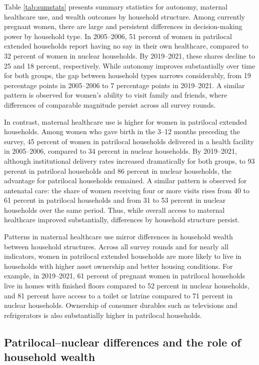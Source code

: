 \documentclass[12pt]{article}
\begin{document}
Table \ref{tab:sumstats} presents summary statistics for autonomy, maternal healthcare use, and wealth outcomes by household structure. Among currently pregnant women, there are large and persistent differences in decision-making power by household type. In 2005–2006, 51 percent of women in patrilocal extended households report having no say in their own healthcare, compared to 32 percent of women in nuclear households. By 2019–2021, these shares decline to 25 and 18 percent, respectively. While autonomy improves substantially over time for both groups, the gap between household types narrows considerably, from 19 percentage points in 2005–2006 to 7 percentage points in 2019–2021. A similar pattern is observed for women’s ability to visit family and friends, where differences of comparable magnitude persist across all survey rounds.

In contrast, maternal healthcare use is higher for women in patrilocal extended households. Among women who gave birth in the 3–12 months preceding the survey, 45 percent of women in patrilocal households delivered in a health facility in 2005–2006, compared to 34 percent in nuclear households. By 2019–2021, although institutional delivery rates increased dramatically for both groups, to 93 percent in patrilocal households and 86 percent in nuclear households, the advantage for patrilocal households remained. A similar pattern is observed for antenatal care: the share of women receiving four or more visits rises from 40 to 61 percent in patrilocal households and from 31 to 53 percent in nuclear households over the same period. Thus, while overall access to maternal healthcare improved substantially, differences by household structure persist.

Patterns in maternal healthcare use mirror differences in household wealth between household structures. Across all survey rounds and for nearly all indicators, women in patrilocal extended households are more likely to live in households with higher asset ownership and better housing conditions. For example, in 2019–2021, 61 percent of pregnant women in patrilocal households live in homes with finished floors compared to 52 percent in nuclear households, and 81 percent have access to a toilet or latrine compared to 71 percent in nuclear households. Ownership of consumer durables such as televisions and refrigerators is also substantially higher in patrilocal households.


\subsection{Patrilocal–nuclear differences and the role of household wealth}
\end{document}
